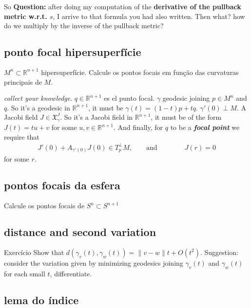 So \textbf{Question:} after doing my computation of the \textbf{derivative of the pullback metric w.r.t. \(s\)}, I arrive to that formula you had also written. Then what? how do we multiply by the inverse of the pullback metric?
\fi

\subsection{ponto focal hipersuperfície}

\(M^n \subset \mathbb{R}^{n+1}\) hipersuperfície. Calcule os pontos focais em função das curvaturas principais de \(M\).

\textit{collect your knowledge}. \(q \in \mathbb{R}^{n+1}\) es el punto focal. \(\gamma\) geodesic joining \(p \in M^n\) and \(q\). So it's a geodesic in \(\mathbb{R}^{n+1}\), it must be \(\gamma(t)=(1-t)p+tq\). \(\gamma'(0) \perp M\). A Jacobi field \(J \in \mathfrak{X}^J_\gamma\). So it's a Jacobi field in \(\mathbb{R}^{n+1}\), it must be of the form \(J(t)=tu+v\) for some \(u,v \in \mathbb{R}^{n+1}\). And finally, for \(q\) to be a \textit{\textbf{focal point}} we require that
\begin{align*}
\boxed{J'(0)+A_{\gamma'(0)}J(0)\in T^{\perp}_pM,\qquad \text{and} \qquad \qquad J(r)=0 }
\end{align*}
for some \(r\).

\subsection{pontos focais da esfera}

Calcule os pontos focais de \(S^n \subset S^{n+1}\)

\subsection{distance and second variation}

\begin{thing6}{Exercício}\label{exer:}\leavevmode
Show that \(d(\gamma_v(t),\gamma_w(t))=\|v-w\|t+O(t^2)\). Suggestion: consider the variation given by minimizing geodesics joining \(\gamma_v(t)\) and \(\gamma_w(t)\) for each small \(t\), differentiate.
\end{thing6}

\subsection{lema do índice}

